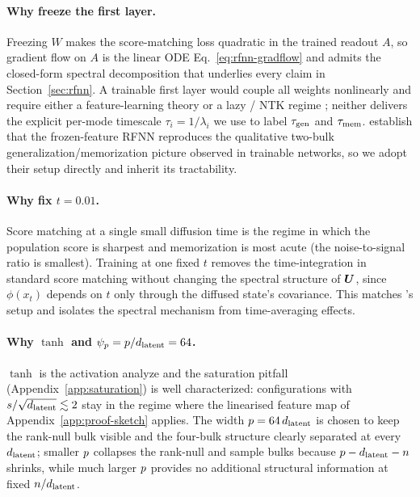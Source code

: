 \paragraph{Why freeze the first layer.}
Freezing $W$ makes the score-matching loss quadratic in the trained
readout $A$, so gradient flow on $A$ is the linear ODE
Eq.~\eqref{eq:rfnn-gradflow} and admits the closed-form spectral
decomposition that underlies every claim in Section~\ref{sec:rfnn}.
A trainable first layer would couple all weights nonlinearly and
require either a feature-learning theory \citep{mei2018meanfield} or
a lazy / NTK regime \citep{jacot2018ntk}; neither delivers the
explicit per-mode timescale $\tau_i = 1/\lambda_i$ we use to label
$\tau_{\mathrm{gen}}$ and $\tau_{\mathrm{mem}}$. \citet{bonnaire2025} establish that the
frozen-feature RFNN reproduces the qualitative two-bulk
generalization/memorization picture observed in trainable networks,
so we adopt their setup directly and inherit its tractability.

\paragraph{Why fix $t = 0.01$.}
Score matching at a single small diffusion time is the regime in
which the population score is sharpest and memorization is most
acute (the noise-to-signal ratio is smallest). Training at one
fixed $t$ removes the time-integration in standard score matching
without changing the spectral structure of $\bm{U}$, since
$\phi(x_t)$ depends on $t$ only through the diffused state's
covariance. This matches \citeauthor{bonnaire2025}'s setup and
isolates the spectral mechanism from time-averaging effects.

\paragraph{Why $\tanh$ and $\psi_p = p / d_{\mathrm{latent}} = 64$.}
$\tanh$ is the activation \citet{bonnaire2025} analyze and the
saturation pitfall (Appendix~\ref{app:saturation}) is well
characterized: configurations with $s / \sqrt{d_{\mathrm{latent}}} \lesssim 2$
stay in the regime where the linearised feature map of
Appendix~\ref{app:proof-sketch} applies. The width
$p = 64\,d_{\mathrm{latent}}$ is chosen to keep the rank-null bulk visible
and the four-bulk structure clearly separated at every $d_{\mathrm{latent}}$;
smaller $p$ collapses the rank-null and sample bulks because
$p - d_{\mathrm{latent}} - n$ shrinks, while much larger $p$
provides no additional structural information at fixed
$n / d_{\mathrm{latent}}$.


